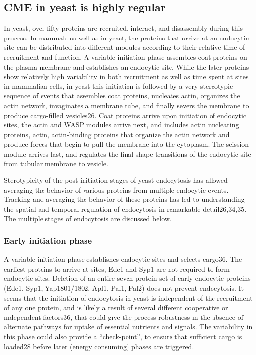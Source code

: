 		\subsection{CME in yeast is highly regular}
		In yeast, over fifty proteins are recruited, interact, and disassembly during this process. In mammals as well as in yeast, the proteins that arrive at an endocytic site can be distributed into different modules according to their relative time of recruitment and function. A variable initiation phase assembles coat proteins on the plasma membrane and establishes an endocytic site. While the later proteins show relatively high variability in both recruitment as well as time spent at sites in mammalian cells, in yeast this initiation is followed by a very stereotypic sequence of events that assembles coat proteins, nucleates actin, organizes the actin network, invaginates a membrane tube, and finally severs the membrane to produce cargo-filled vesicles26. Coat proteins arrive upon initiation of endocytic sites, the actin and WASP modules arrive next, and includes actin nucleating proteins, actin, actin-binding proteins that organize the actin network and produce forces that begin to pull the membrane into the cytoplasm. The scission module arrives last, and regulates the final shape transitions of the endocytic site from tubular membrane to vesicle. 

		\vspace{5mm}
		Sterotypicity of the post-initiation stages of yeast endocytosis has allowed averaging the behavior of various proteins from multiple endocytic events. Tracking and averaging the behavior of these proteins has led to understanding the spatial and temporal regulation of endocytosis in remarkable detail26,34,35. The multiple stages of endocytosis are discussed below. 
		
 


			\subsubsection{Early initiation phase}
			A variable initiation phase establishes endocytic sites and selects cargo36. The earliest proteins to arrive at sites, Ede1 and Syp1 are not required to form endocytic sites. Deletion of an entire seven protein set of early endocytic proteins (Ede1, Syp1, Yap1801/1802, Apl1, Pal1, Pal2) does not prevent endocytosis. It seems that the initiation of endocytosis in yeast is independent of the recruitment of any one protein, and is likely a result of several different cooperative or independent factors36, that could give the process robustness in the absence of alternate pathways for uptake of essential nutrients and signals. The variability in this phase could also provide a “check-point”, to ensure that sufficient cargo is loaded28 before later (energy consuming) phases are triggered. 

